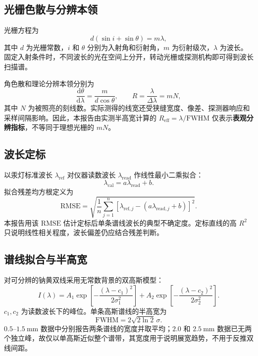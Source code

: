 \documentclass[UTF8,a4paper,11pt]{ctexart}
\newcommand{\RMSE}{\mathrm{RMSE}}
\newcommand{\FWHM}{\mathrm{FWHM}}
\begin{document}
\subsection{光栅色散与分辨本领}
光栅方程为
\begin{equation}
  d(\sin i+\sin\theta)=m\lambda,
  \label{eq:grating}
\end{equation}
其中 $d$ 为光栅常数，$i$ 和 $\theta$ 分别为入射角和衍射角，$m$ 为衍射级次，$\lambda$ 为波长。固定入射条件时，不同波长的光在空间上分开，转动光栅或探测机构即可得到波长扫描谱。

角色散和理论分辨本领分别为
\begin{equation}
  \frac{\mathrm{d}\theta}{\mathrm{d}\lambda}=\frac{m}{d\cos\theta},
  \qquad R=\frac{\lambda}{\Delta\lambda}=mN,
\end{equation}
其中 $N$ 为被照亮的刻线数。实际测得的线宽还受狭缝宽度、像差、探测器响应和采样间隔影响。因此，本报告由实测半高宽计算的 $R_{\mathrm{eff}}=\lambda/\FWHM$ 仅表示\textbf{表观分辨指标}，不等同于理想光栅的 $mN$。

\subsection{波长定标}
以汞灯标准波长 $\lambda_{\mathrm{ref}}$ 对仪器读数波长 $\lambda_{\mathrm{read}}$ 作线性最小二乘拟合：
\begin{equation}
  \lambda_{\mathrm{cal}}=a\lambda_{\mathrm{read}}+b.
  \label{eq:calibration}
\end{equation}
拟合残差均方根定义为
\begin{equation}
  \RMSE=\sqrt{\frac{1}{n}\sum_{j=1}^{n}\left[\lambda_{\mathrm{ref},j}-(a\lambda_{\mathrm{read},j}+b)\right]^2}.
  \label{eq:rmse}
\end{equation}
本报告用该 $\RMSE$ 估计定标后单条谱线波长的典型不确定度。定标直线的高 $R^2$ 只说明线性相关程度，波长偏差仍应结合残差判断。

\subsection{谱线拟合与半高宽}
对可分辨的钠黄双线采用无常数背景的双高斯模型：
\begin{equation}
  I(\lambda)=A_1\exp\!\left[-\frac{(\lambda-c_1)^2}{2\sigma_1^2}\right]
  +A_2\exp\!\left[-\frac{(\lambda-c_2)^2}{2\sigma_2^2}\right].
  \label{eq:double_gaussian}
\end{equation}
$c_1,c_2$ 为读数波长下的峰位。单条高斯谱线的半高宽为
\begin{equation}
  \FWHM=2\sqrt{2\ln2}\,\sigma.
\end{equation}
$0.5$--$1.5\ \mathrm{mm}$ 数据中分别报告两条谱线的宽度并取平均；$2.0$ 和 $2.5\ \mathrm{mm}$ 数据已无两个独立峰，故仅以单高斯近似整个谱带，其宽度用于说明展宽趋势，不用于反推双线间距。
\end{document}
